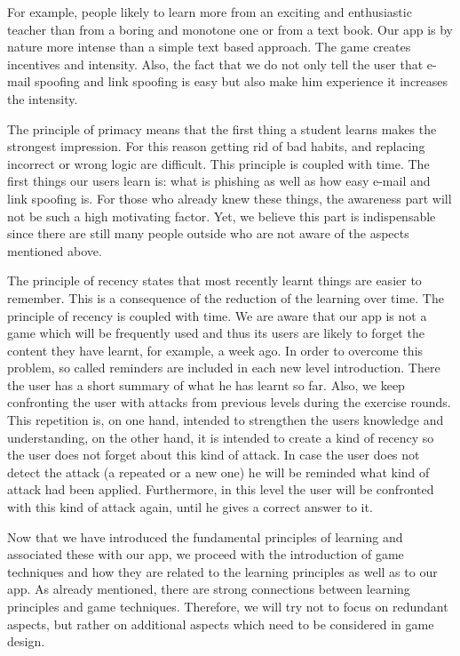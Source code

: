 \begin{description}[leftmargin=0cm]
For example, people likely to learn more from an exciting and enthusiastic teacher than from a boring and monotone one or from a text book.
Our app is by nature more intense than a simple text based approach.
The game creates incentives and intensity.
Also, the fact that we do not only tell the user that e-mail spoofing and link spoofing is easy but also make him experience it increases the intensity.
	\item[Primacy] The principle of primacy means that the first thing a student learns makes the strongest impression. 
For this reason getting rid of bad habits, and replacing incorrect or wrong logic are difficult. 
This principle is coupled with time. 
The first things our users learn is: what is phishing as well as how easy e-mail and link spoofing is. 
For those who already knew these things, the awareness part will not be such a high motivating factor. 
Yet, we believe this part is indispensable since there are still many people outside who are not aware of the aspects mentioned above. 
	\item[Recency] The principle of recency states that most recently learnt things are easier to remember. 
This is a consequence of the reduction of the learning over time. 
The principle of recency is coupled with time. 
We are aware that our app is not a game which will be frequently used and thus its users are likely to forget the content they have learnt, for example, a week ago. 
In order to overcome this problem, so called reminders are included in each new level introduction. 
There the user has a short summary of what he has learnt so far. 
Also, we keep confronting the user with attacks from previous levels during the exercise rounds.
This repetition is, on one hand, intended to strengthen the users knowledge and understanding, on the other hand, it is intended to create a kind of recency so the user does not forget about this kind of attack. 
In case the user does not detect the attack (a repeated or a new one) he will be reminded what kind of attack had been applied. 
Furthermore, in this level the user will be confronted with this kind of attack again, until he gives a correct answer to it.
\end{description}
Now that we have introduced the fundamental principles of learning and associated these with our app, we proceed with the introduction of game techniques and how they are related to the learning principles as well as to our app. 
As already mentioned, there are strong connections between learning principles and game techniques. 
Therefore, we will try not to focus on redundant aspects, but rather on additional aspects which need to be considered in game design. 

